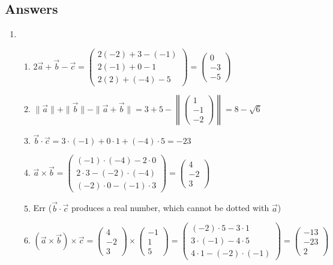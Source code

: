 \newpage
\subsection{Answers}

\begin{enumerate}
\item \begin{enumerate}
\item $2\vec{a} + \vec{b} - \vec{c} = \begin{pmatrix} 2(-2) + 3 - (-1) \\ 2(-1) + 0 - 1 \\ 2(2) + (-4) - 5 \end{pmatrix} = \begin{pmatrix} 0 \\ -3 \\ -5 \end{pmatrix}$
\item $\|\vec{a}\| + \|\vec{b}\| - \|\vec{a} + \vec{b}\| = 3 + 5 - \left\|\begin{pmatrix} 1 \\ -1 \\ -2 \end{pmatrix}\right\| = 8 - \sqrt{6}$
\item $\vec{b}\cdot\vec{c} = 3\cdot (-1) + 0\cdot 1 + (-4)\cdot 5 = -23$
\item $\vec{a}\times\vec{b} = \begin{pmatrix} (-1)\cdot (-4) - 2\cdot 0 \\ 2\cdot 3 - (-2)\cdot (-4) \\ (-2)\cdot 0 - (-1)\cdot 3 \end{pmatrix} = \begin{pmatrix} 4 \\ -2 \\ 3 \end{pmatrix}$
\item Err ($\vec{b}\cdot\vec{c}$ produces a real number, which cannot be dotted with $\vec{a}$)
\item $(\vec{a}\times\vec{b})\times\vec{c} = \begin{pmatrix} 4 \\ -2 \\ 3 \end{pmatrix}\times\begin{pmatrix} -1 \\ 1 \\ 5 \end{pmatrix} = \begin{pmatrix} (-2)\cdot 5 - 3\cdot 1 \\ 3\cdot (-1) - 4\cdot 5 \\ 4\cdot 1 - (-2)\cdot (-1) \end{pmatrix} = \begin{pmatrix} -13 \\ -23 \\ 2 \end{pmatrix}$

\end{enumerate}
\end{enumerate}
